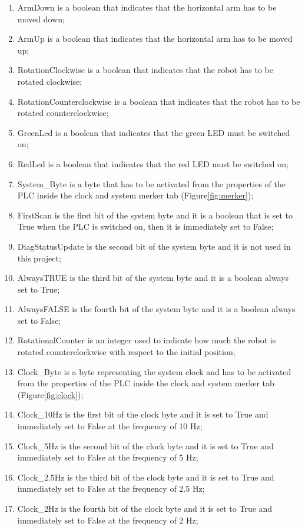 \begin{enumerate}
    \item ArmDown is a boolean that indicates that the horizontal arm has to be moved down;
    \item ArmUp is a boolean that indicates that the horizontal arm has to be moved up;
    \item RotationClockwise is a boolean that indicates that the robot has to be rotated clockwise;
    \item RotationCounterclockwise is a boolean that indicates that the robot has to be rotated counterclockwise;
    \item GreenLed is a boolean that indicates that the green LED must be switched on;
    \item RedLed is a boolean that indicates that the red LED must be switched on;
    \item System\_Byte is a byte that has to be activated from the properties of the PLC inside the clock and system merker tab (Figure\ref{fig:merker});
    \item FirstScan is the first bit of the system byte and it is a boolean that is set to True when the PLC is switched on, then it is immediately set to False;
    \item DiagStatusUpdate is the second bit of the system byte and it is not used in this project;
    \item AlwaysTRUE is the third bit of the system byte and it is a boolean always set to True;
    \item AlwaysFALSE is the fourth bit of the system byte and it is a boolean always set to False;
    \item RotationalCounter is an integer used to indicate how much the robot is rotated counterclockwise with respect to the initial position;
    \item Clock\_Byte is a byte representing the system clock and has to be activated from the properties of the PLC inside the clock and system merker tab (Figure\ref{fig:clock});
    \item Clock\_10Hz is the first  bit of the clock byte and it is set to True and immediately set to False at the frequency of 10 Hz;
    \item Clock\_5Hz is the second bit of the clock byte and it is set to True and immediately set to False at the frequency of 5 Hz;
    \item Clock\_2.5Hz is the third  bit of the clock byte and it is set to True and immediately set to False at the frequency of 2.5 Hz;
    \item Clock\_2Hz is the fourth  bit of the clock byte and it is set to True and immediately set to False at the frequency of 2 Hz;

\end{enumerate}
